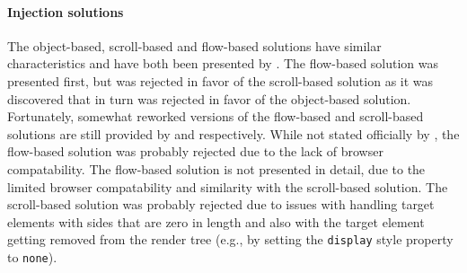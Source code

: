 \documentclass[a4paper,11pt]{kth-mag}
\newcommand{\code}[1]{\texttt{#1}}
\begin{document}
        \paragraph{Injection solutions}
        The object-based, scroll-based and flow-based solutions have similar characteristics and have both been presented by \cite{backalley}.
        The flow-based solution was presented first, but was rejected in favor of the scroll-based solution as it was discovered that in turn was rejected in favor of the object-based solution.
        Fortunately, somewhat reworked versions of the flow-based and scroll-based solutions are still provided by \cite{eq_imp_prollyfill-min-width} and \cite{eq_imp_css-element-queries} respectively.
        While not stated officially by \cite{backalley}, the flow-based solution was probably rejected due to the lack of \gls{browser} compatability.
        The flow-based solution is not presented in detail, due to the limited \gls{browser} compatability and similarity with the scroll-based solution.
        The scroll-based solution was probably rejected due to issues with handling target \glspl{element} with sides that are zero in length and also with the target element getting removed from the \gls{render tree} (e.g., by setting the \code{display} style property to \code{none}).
\end{document}
